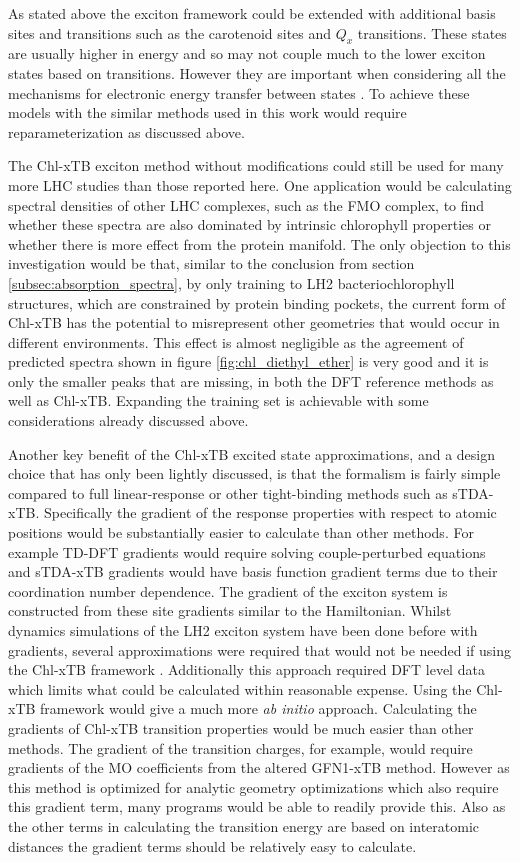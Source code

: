 As stated above the exciton framework could be extended with additional basis sites
and transitions such as the carotenoid sites and $Q_x$ transitions. These states 
are usually higher in energy and so may not couple much to the lower exciton states
based on \Qy transitions. However they are important when considering all the mechanisms
for electronic energy transfer between states \cite{Polli2006}. To achieve these
models with the similar methods used in this work would require reparameterization 
as discussed above.

The Chl-xTB exciton method without modifications could still be used for many more
LHC studies than those reported here. One application would be calculating spectral 
densities of other LHC complexes, such as the FMO complex, to find whether these 
spectra are also dominated by intrinsic chlorophyll properties or whether there 
is more effect from the protein manifold. The only objection to this investigation 
would be that, similar to the conclusion from section \ref{subsec:absorption_spectra}, 
by only training to LH2 bacteriochlorophyll structures, which are constrained by
protein binding pockets, the current form of Chl-xTB has the potential to misrepresent
other geometries that would occur in different environments. This effect is almost 
negligible as the agreement of predicted spectra shown in figure \ref{fig:chl_diethyl_ether} 
is very good and it is only the smaller \Qy peaks that are missing, in both the 
DFT reference methods as well as Chl-xTB. Expanding the training set is achievable 
with some considerations already discussed above.

Another key benefit of the Chl-xTB excited state approximations, and a design choice 
that has only been lightly discussed, is that the formalism is fairly simple compared 
to full linear-response or other tight-binding methods such as sTDA-xTB. Specifically
the gradient of the response properties with respect to atomic positions would be
substantially easier to calculate than other methods. For example TD-DFT gradients 
would require solving couple-perturbed equations and sTDA-xTB gradients would have 
basis function gradient terms due to their coordination number dependence. The gradient
of the exciton system is constructed from these site gradients similar to the Hamiltonian.
Whilst dynamics simulations of the LH2 exciton system have been done before with
gradients, several approximations were required that would not be needed if using
the Chl-xTB framework \cite{Sisto2017}. Additionally this approach required DFT 
level data which limits what could be calculated within reasonable expense. Using 
the Chl-xTB framework would give a much more \emph{ab initio} approach. Calculating 
the gradients of Chl-xTB transition properties would be much easier than other methods.
The gradient of the transition charges, for example, would require gradients of 
the MO coefficients from the altered GFN1-xTB method. However as this method is 
optimized for analytic geometry optimizations which also require this gradient term,
many programs would be able to readily provide this. Also as the other terms in 
calculating the transition energy are based on interatomic distances the gradient 
terms should be relatively easy to calculate.

